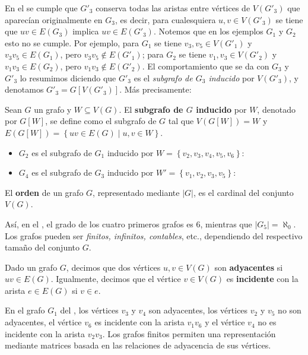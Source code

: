 En el  se cumple que $G'_3$ conserva todas las aristas entre vértices de $V(G'_3)$ que aparecían originalmente en $G_3$, es decir, para cualesquiera $u,v\in V(G'_3)$ se tiene que $uv\in E(G_3)$ implica $uv\in E(G'_3)$. Notemos que en los ejemplos $G_1$ y $G_2$ esto no se cumple. Por ejemplo, para $G_1$ se tiene $v_3,v_5\in V(G'_1)$ y $v_3v_5\in E(G_1)$, pero $v_3v_5 \notin E(G'_1)$; para $G_2$ se tiene $v_1,v_3\in V(G'_2)$ y $v_1v_3\in E(G_2)$, pero $v_1v_3\notin E(G'_2)$. El comportamiento que se da con $G_3$ y $G'_3$ lo resumimos diciendo que $G'_3$ es el \textit{subgrafo de $G_3$ inducido} por $V(G'_3)$, y denotamos $G'_3=G[V(G'_3)]$. Más precisamente:
\begin{Def}
   Sean $G$ un grafo y $W\subseteq V(G)$. El \textbf{subgrafo de $G$ inducido} por $W$, denotado por $G[W]$, se define como el subgrafo de $G$ tal que $V(G[W])=W$ y $E(G[W])=\left\lbrace uv\in E(G)\mid u,v\in W\right\rbrace$.
\end{Def}
\begin{Ejm}
   \phantom{o}
   \begin{itemize}
      \item $G_2$ es el subgrafo de $G_1$ inducido por $W=\left\lbrace v_2,v_3,v_4,v_5,v_6\right\rbrace$:
           
      \item $G_4$ es el subgrafo de $G_3$ inducido por $W'=\left\lbrace v_1,v_2,v_3,v_5\right\rbrace$:
           
   \end{itemize}
\end{Ejm}
\begin{Def}
   El \textbf{orden} de un grafo $G$, representado mediante $|G|$, es el cardinal del conjunto $V(G)$.
\end{Def}
Así, en el , el grado de los cuatro primeros grafos es $6$, mientras que $|G_5|=\aleph _0$. Los grafos pueden ser \textit{finitos, infinitos, contables}, etc., dependiendo del respectivo tamaño del conjunto $G$.
\begin{Def}
   Dado un grafo $G$, decimos que dos vértices $u,v\in V(G)$ son \textbf{adyacentes} si $uv\in E(G)$. Igualmente, decimos que el vértice $v\in V(G)$ es \textbf{incidente} con la arista $e\in E(G)$ si $v\in e$. 
\end{Def}
En el grafo $G_1$ del , los vértices $v_3$ y $v_4$ son adyacentes, los vértices $v_2$ y $v_5$ no son adyacentes, el vértice $v_6$ es incidente con la arista $v_1v_6$ y el vértice $v_4$ no es incidente con la arista $v_2v_3$. Los grafos finitos permiten una representación mediante matrices basada en las relaciones de adyacencia de sus vértices.
